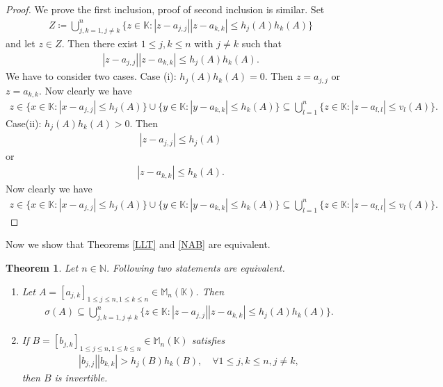 \documentclass{amsart}
\newtheorem{theorem}{Theorem}[section]
\begin{document}
\begin{proof}
We prove the first inclusion, proof of second inclusion is similar. Set 
\begin{align*}
Z\coloneqq \bigcup_{j,k=1, j \neq k}^n\{z \in \mathbb{K}: |z-a_{j, j}||z-a_{k,k}|\leq h_j(A)h_k(A)\}
\end{align*}	
and let $z \in Z$. Then there exist $1\leq j, k \leq n$ with $j \neq k$ such that 
\begin{align*}
	|z-a_{j, j}||z-a_{k,k}|\leq h_j(A)h_k(A).
\end{align*}
We have to consider two cases. Case (i): $h_j(A)h_k(A)=0$. Then $z=a_{j, j}$ or $z=a_{k, k}$. Now clearly we have 
\begin{align*}
	z \in \{x \in \mathbb{K}: |x-a_{j,j}|\leq h_j(A)\} \cup \{y \in \mathbb{K}: |y-a_{k, k}|\leq h_k(A)\} \subseteq \bigcup_{l=1}^n\{z \in \mathbb{K}: |z-a_{l, l}|\leq v_l(A)\}.
\end{align*}
Case(ii): $h_j(A)h_k(A)>0$. Then 
\begin{align*}
	|z-a_{j, j}|\leq h_j(A)	
\end{align*}
or 
\begin{align*}
	|z-a_{k,k}|\leq h_k(A).
\end{align*}
Now clearly we have 
\begin{align*}
	z \in \{x \in \mathbb{K}: |x-a_{j,j}|\leq h_j(A)\} \cup \{y \in \mathbb{K}: |y-a_{k, k}|\leq h_k(A)\} \subseteq \bigcup_{l=1}^n\{z \in \mathbb{K}: |z-a_{l, l}|\leq v_l(A)\}.
\end{align*}
\end{proof}
Now we show that Theorems \ref{LLT} and \ref{NAB} are equivalent.
\begin{theorem}\label{E1}
	Let $n \in \mathbb{N}$.  Following two statements are equivalent. 
	\begin{enumerate}[\upshape(i)]
		\item Let $A=[a_{j,k}]_{1\leq j\leq n, 1\leq k \leq n}\in  \mathbb{M}_n(\mathbb{K})$. Then 
		\begin{align*}
			\sigma(A)\subseteq \bigcup_{j,k=1, j \neq k}^n\{z \in \mathbb{K}: |z-a_{j, j}||z-a_{k,k}|\leq h_j(A)h_k(A)\}.
		\end{align*}
		\item 	If  $B=[b_{j,k}]_{1\leq j\leq n, 1\leq k \leq n}\in  \mathbb{M}_n(\mathbb{K})$ satisfies
		\begin{align*}
			|b_{j,j}||b_{k,k}|>	h_j(B)h_k(B), \quad \forall 1\leq j, k \leq n, j \neq k,
		\end{align*}
		then $B$ is invertible. 
	\end{enumerate}
\end{theorem}
\end{document}
